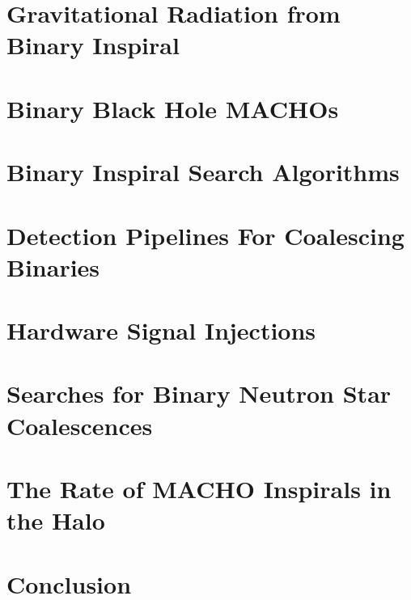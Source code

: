 \documentclass[12pt]{report}
\begin{document}
\chapter{Gravitational Radiation from Binary Inspiral}

\chapter{Binary Black Hole MACHOs}

\chapter{Binary Inspiral Search Algorithms}

\chapter{Detection Pipelines For Coalescing Binaries}

\chapter{Hardware Signal Injections}

\chapter{Searches for Binary Neutron Star Coalescences}

\chapter{The Rate of MACHO Inspirals in the Halo}


\chapter{Conclusion}


\clearpage



\clearpage
{}

\begin{startvita}
\end{startvita}

\renewenvironment{thebibliography}[1]%
  {\begin{list}{\labelenumi\hss}%
     {\usecounter{enumi}\setlength{\labelwidth}{3em}%
      \setlength{\leftmargin}{5em}}}%
  {\end{list}}
\renewcommand{\bibitem}[1]{\item\label{#1}\relax}%
\renewcommand{\theenumi}{\arabic{enumi}}%
\begin{publications}
\putbib[papers]
\end{publications}

\finishvita
\end{document}
